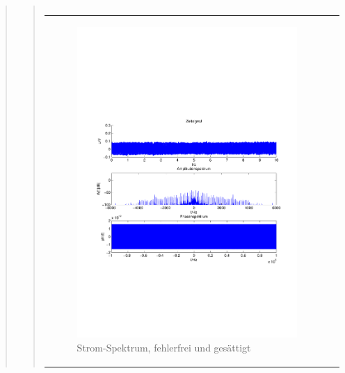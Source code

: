 \begin{quote}
\begin{quote}
\begin{center}
\begin{tabular}{ll}
                \end{tabular}
                \end{center}
                
                
                                        \begin{center}
                \begin{tabular}{ll}
    
                \hspace{-8em}
                    \begin{minipage}{0.6\textwidth}
    
                        \begin{figure}[H]
                            \label{fig:}
                            \includegraphics[scale=0.4, trim = 2cm 6cm 1cm
                            7.5cm,
                            clip]{./Bilder/Termin8/fehlerfrei_gesaettig_Spektrum.pdf}
                            \caption{Strom-Spektrum, fehlerfrei und gesättigt}
                        \end{figure}
    

\end{minipage}
\end{tabular}
\end{center}
\end{quote}
\end{quote}
